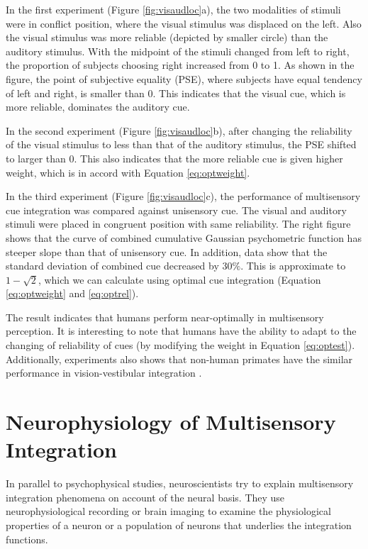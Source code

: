 \documentclass{article}[11pt]
\begin{document}
In the first experiment (Figure \ref{fig:visaudloc}a), the two modalities of stimuli were in conflict position, where the visual stimulus was displaced on the left. Also the visual stimulus was more reliable (depicted by smaller circle) than the auditory stimulus. With the midpoint of the stimuli changed from left to right, the proportion of subjects choosing right increased from 0 to 1. As shown in the figure, the point of subjective equality (PSE), where subjects have equal tendency of left and right, is smaller than 0. This indicates that the visual cue, which is more reliable, dominates the auditory cue.

In the second experiment (Figure \ref{fig:visaudloc}b), after changing the reliability of the visual stimulus to less than that of the auditory stimulus, the PSE shifted to larger than 0. This also indicates that the more reliable cue is given higher weight, which is in accord with Equation \ref{eq:optweight}.

In the third experiment (Figure \ref{fig:visaudloc}c), the performance of multisensory cue integration was compared against unisensory cue. The visual and auditory stimuli were placed in congruent position with same reliability. The right figure shows that the curve of combined cumulative Gaussian psychometric function has steeper slope than that of unisensory cue. In addition, data show that the standard deviation of combined cue decreased by $30\%$. This is approximate to $1-\sqrt{2}$, which we can calculate using optimal cue integration (Equation \ref{eq:optweight} and \ref{eq:optrel}).

The result indicates that humans perform near-optimally in multisensory perception. It is interesting to note that humans have the ability to adapt to the changing of reliability of cues (by modifying the weight in Equation \ref{eq:optest}). Additionally, experiments also shows that non-human primates have the similar performance in vision-vestibular integration \cite{gu_neural_2008}.

\section{Neurophysiology of Multisensory Integration}
In parallel to psychophysical studies, neuroscientists try to explain multisensory integration phenomena on account of the neural basis.
They use neurophysiological recording or brain imaging to examine the physiological properties of a neuron or a population of neurons that underlies the integration functions.
\end{document}
